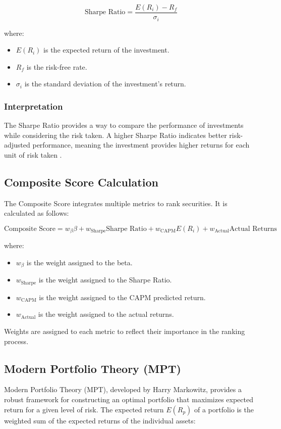 \begin{equation}
\text{Sharpe Ratio} = \frac{E(R_i) - R_f}{\sigma_i}
\end{equation}

where:
\begin{itemize}
    \item $E(R_i)$ is the expected return of the investment.
    \item $R_f$ is the risk-free rate.
    \item $\sigma_i$ is the standard deviation of the investment's return.
\end{itemize}

\subsubsection{Interpretation}
The Sharpe Ratio provides a way to compare the performance of investments while considering the risk taken. A higher Sharpe Ratio indicates better risk-adjusted performance, meaning the investment provides higher returns for each unit of risk taken \citep{sharpe1966mutual}.

\subsection{Composite Score Calculation}
The Composite Score integrates multiple metrics to rank securities. It is calculated as follows:

\begin{equation}
\text{Composite Score} = w_{\beta} \beta + w_{\text{Sharpe}} \text{Sharpe Ratio} + w_{\text{CAPM}} E(R_i) + w_{\text{Actual}} \text{Actual Returns}
\end{equation}

where:
\begin{itemize}
    \item $w_{\beta}$ is the weight assigned to the beta.
    \item $w_{\text{Sharpe}}$ is the weight assigned to the Sharpe Ratio.
    \item $w_{\text{CAPM}}$ is the weight assigned to the CAPM predicted return.
    \item $w_{\text{Actual}}$ is the weight assigned to the actual returns.
\end{itemize}

Weights are assigned to each metric to reflect their importance in the ranking process.

\subsection{Modern Portfolio Theory (MPT)}
Modern Portfolio Theory (MPT), developed by Harry Markowitz, \citep{markowitz1952portfolio} provides a robust framework for constructing an optimal portfolio that maximizes expected return for a given level of risk. The expected return $E(R_p)$ of a portfolio is the weighted sum of the expected returns of the individual assets:

